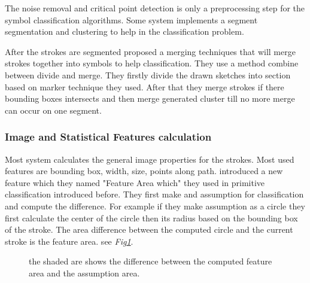 The noise removal and critical point detection is only a preprocessing step for the symbol classification algorithms. Some system implements a segment segmentation and clustering to help in the classification problem. 

After the strokes are segmented \cite {sketchunderstanding1,HierarchicalParsing7,Simusketch51}  proposed a merging techniques that will merge strokes together into symbols to help classification. They use a method combine between divide and merge. They firstly divide the drawn sketches into section based on marker technique they used. After that they merge strokes if there bounding boxes intersects and then  merge generated cluster till no more merge can occur on one segment.


%

 
\subsubsection{Image and Statistical Features calculation}
\label{sec:ImageandStatisticalFeaturescalculation}


Most system calculates the general image properties for the strokes. Most used features are bounding box, width, size, points along path. 
\cite {meanshift10,domainindependent17}  introduced a new feature which they named "Feature Area which" they used in primitive classification introduced before. They first make and assumption for classification and compute the difference. For example if they make assumption as a circle they first calculate the center of the circle then its radius based on the bounding box of the stroke. The area difference between the computed circle and the current stroke is the feature area. see \textit{Fig\ref{fig:featurearearc}}. 

\begin{figure}


		
			\caption[Feature area]{the shaded are shows the difference between the computed feature area and the assumption area. }
	\label{fig:featurearearc}
\end{figure}


